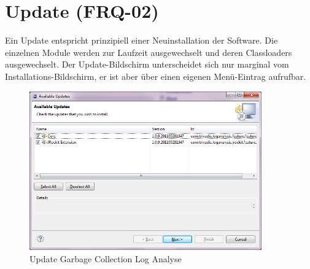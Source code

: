 \section{Update (FRQ-02)}
Ein Update entspricht prinzipiell einer Neuinstallation der Software. Die einzelnen Module werden zur Laufzeit ausgewechselt und deren Classloaders ausgewechselt. Der Update-Bildschirm unterscheidet sich nur marginal vom Installations-Bildschirm, er ist aber über einen eigenen Menü-Eintrag aufrufbar.
 \begin{figure}[H]
  	\centering
    	\includegraphics[width=10cm]{images/tutorial_update01}
        	\caption{Update Garbage Collection Log Analyse}
\end{figure}

